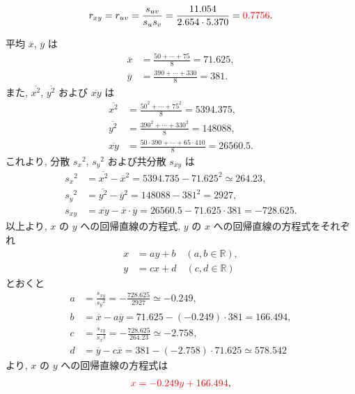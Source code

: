 \begin{qenumerate}
{\begin{align}
			r_{xy} = r_{uv} = \frac{s_{uv}}{s_{u}s_{v}} = \frac{11.054}{2.654\cdot 5.370} = \textcolor{red}{0.7756}.
		\end{align}
	}
	\item{
		平均 $\overline{x}$, $\overline{y}$ は
		\begin{align}
			\overline{x} &= \frac{50 + \cdots + 75}{8} = 71.625, \\
			\overline{y} &= \frac{390 + \cdots + 330}{8} = 381.
		\end{align}
		また, $\overline{x^{2}}$, $\overline{y^{2}}$ および $\overline{xy}$ は
		\begin{align}
			\overline{x^{2}} &= \frac{50^{2} + \cdots + 75^{2}}{8} = 5394.375, \\
			\overline{y^{2}} &= \frac{390^{2} + \cdots + 330^{2}}{8} = 148088, \\
			\overline{xy} &= \frac{50\cdot 390 + \cdots + 65\cdot 410}{8} = 26560.5.
		\end{align}
		これより, 分散 ${s_{x}}^{2}$, ${s_{y}}^{2}$ および共分散 $s_{xy}$ は
		\begin{align}
			{s_{x}}^{2} &= \overline{x^{2}} - {\overline{x}}^{2} = 5394.735 - 71.625^{2} \simeq 264.23, \\
			{s_{y}}^{2} &= \overline{y^{2}} - {\overline{y}}^{2} = 148088 - 381^{2} = 2927, \\
			s_{xy} &= \overline{xy} - \overline{x}\cdot \overline{y} = 26560.5 - 71.625\cdot 381 = -728.625.
		\end{align}
		以上より, $x$ の $y$ への回帰直線の方程式, $y$ の $x$ への回帰直線の方程式をそれぞれ
		\begin{align}
			x &= ay + b\quad (a, b\in\mathbb{R}), \\
			y &= cx + d\quad (c, d\in\mathbb{R})
		\end{align}
		とおくと
		\begin{align}
			a &= \frac{s_{xy}}{{s_{y}}^{2}} = -\frac{728.625}{2927} \simeq -0.249, \\
			b &= \overline{x} - a\overline{y} = 71.625 - (-0.249)\cdot 381 = 166.494, \\
			c &= \frac{s_{xy}}{{s_{x}}^{2}} = -\frac{728.625}{264.23} \simeq -2.758, \\
			d &= \overline{y} - c\overline{x} = 381 - (-2.758)\cdot 71.625 \simeq 578.542
		\end{align}
		より, $x$ の $y$ への回帰直線の方程式は
		\begin{align}
			\textcolor{red}{x = -0.249y + 166.494}, 
		\end{align}
}
\end{qenumerate}
